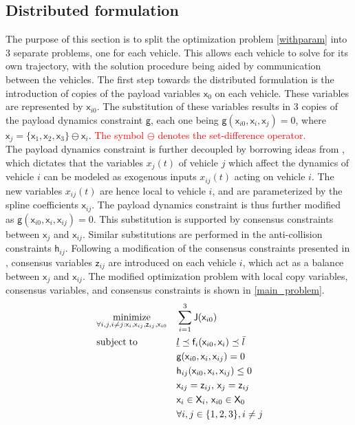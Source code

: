 \documentclass[letterpaper, 10 pt, conference]{ieeeconf}
\newcommand{\ubar}[1]{\text{\b{$#1$}}}
\DeclareMathOperator*{\minimize}{minimize}
\DeclareMathOperator*{\subj}{subject\;to}
\newcommand{\cx}{\textsf{x}}
\newcommand{\cz}{\textsf{z}}
\newcommand{\J}{\textsf{J}}
\newcommand{\cf}{\textsf{f}}
\newcommand{\cg}{\textsf{g}}
\newcommand{\ch}{\textsf{h}}
\newcommand{\X}{\textsf{X}}
\begin{document}
 \subsection{Distributed formulation}
 The purpose of this section is to split the optimization problem \eqref{withparam} into 3 separate problems, one for each vehicle. This allows each vehicle to solve for its own trajectory, with the solution procedure being aided by communication between the vehicles. The first step towards the distributed formulation is the introduction of copies of the payload variables $\cx_0$ on each vehicle. These variables are represented by $\cx_{i0}$. The substitution of these variables results in 3 copies of the payload dynamics constraint $\cg$, each one being $\cg(\cx_{i0},\cx_i,\cx_j) = 0$, where $\cx_j = \{\cx_1,\cx_2,\cx_3\}\ominus \cx_i$. \textcolor{red}{The symbol $\ominus$ denotes the set-difference operator.}
 \\ \indent
 The payload dynamics constraint is further decoupled by borrowing ideas from \cite{c11}, which dictates that the variables $x_{j}(t)$ of vehicle $j$ which affect the dynamics of vehicle $i$ can be modeled as exogenous inputs $x_{ij}(t)$ acting on vehicle $i$. The new variables $x_{ij}(t)$ are hence local to vehicle $i$, and are parameterized by the spline coefficients $\cx_{ij}$. The payload dynamics constraint is thus further modified as $\cg(\cx_{i0},\cx_i,\cx_{ij}) = 0$. This substitution is supported by consensus constraints between  $\cx_{j}$ and $\cx_{ij}$. Similar substitutions are performed in the anti-collision constraints $\ch_{ij}$. Following a modification of the consensus constraints presented in \cite{c16}, consensus variables $\cz_{ij}$ are introduced on each vehicle $i$, which act as a balance between $\cx_{j}$ and $\cx_{ij}$. The modified optimization problem with local copy variables, consensus variables, and consensus constraints is shown in \eqref{main_problem}.
   \begin{equation}
     \label{main_problem}
     \begin{aligned}
       & \minimize_{\forall i,j,i \neq j:\cx_i,\cx_{ij},\cz_{ij},\cx_{i0}} &&  \sum\limits_{i=1}^{3}\J(\cx_{i0}) \\
       & \subj
       && \ubar{l} \preceq \cf_i(\cx_{i0},\cx_i) \preceq \bar{l}\\
       &       && \cg(\cx_{i0},\cx_i,\cx_{ij}) = 0 \\
       &        && \ch_{ij}(\cx_{i0},\cx_i,\cx_{ij}) \leq 0 \\
       &         && \cx_{ij} = \cz_{ij},\, \cx_{j} = \cz_{ij} \\
       &        && \cx_i \in \X_i,\, \cx_{i0} \in \X_0 \\
       &                                && \forall i,j \in \{1,2,3\}, i \neq j
     \end{aligned}
   \end{equation}
\end{document}
